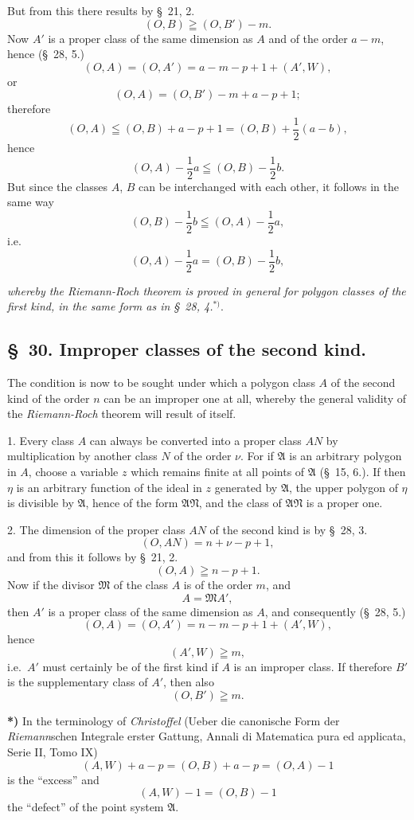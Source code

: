 \documentclass{article}
\begin{document}
But from this there results by §~21, 2.
\[ (O, B) \geqq (O, B')-m. \]
Now $A'$ is a proper class of the same dimension as $A$ and of the order $a-m$, hence (§~28, 5.)
\[ (O, A) = (O, A') = a-m-p+1+(A', W), \]
or
\[ (O, A) = (O, B')-m+a-p+1; \]
therefore
\[ (O, A) \leqq (O, B)+a-p+1 = (O, B)+\frac{1}{2}(a-b), \]
hence
\[ (O, A)-\frac{1}{2}a \leqq (O, B)-\frac{1}{2}b. \]
But since the classes $A$, $B$ can be interchanged with each other, it follows in the same way
\[ (O, B)-\frac{1}{2}b \leqq (O, A)-\frac{1}{2}a, \]
i.e.
\[ (O, A)-\frac{1}{2}a = (O, B)-\frac{1}{2}b, \]

\emph{whereby the Riemann-Roch theorem is proved in general for polygon classes of the first kind, in the same form as in §~28, 4.}${}^{*)}$.

\subsection*{§~30. Improper classes of the second kind.}

The condition is now to be sought under which a polygon class $A$ of the second kind of the order $n$ can be an improper one at all, whereby the general validity of the \emph{Riemann-Roch} theorem will result of itself.

1. Every class $A$ can always be converted into a proper class $AN$ by multiplication by another class $N$ of the order $\nu$. For if $\mathfrak{A}$ is an arbitrary polygon in $A$, choose a variable $z$ which remains finite at all points of $\mathfrak{A}$ (§~15, 6.). If then $\eta$ is an arbitrary function of the ideal in $z$ generated by $\mathfrak{A}$, the upper polygon of $\eta$ is divisible by $\mathfrak{A}$, hence of the form $\mathfrak{A}\mathfrak{N}$, and the class of $\mathfrak{A}\mathfrak{N}$ is a proper one.

2. The dimension of the proper class $AN$ of the second kind is by §~28, 3.
\[ (O, AN) = n+\nu-p+1, \]
and from this it follows by §~21, 2.
\[ (O, A) \geqq n-p+1. \]
Now if the divisor $\mathfrak{M}$ of the class $A$ is of the order $m$, and
\[ A = \mathfrak{M}A', \]
then $A'$ is a proper class of the same dimension as $A$, and consequently (§~28, 5.)
\[ (O, A) = (O, A') = n-m-p+1+(A', W), \]
hence
\[ (A', W) \geqq m, \]
i.e.\ $A'$ must certainly be of the first kind if $A$ is an improper class. If therefore $B'$ is the supplementary class of $A'$, then also
\[ (O, B') \geqq m. \]

\textbf{*)} In the terminology of \emph{Christoffel} (Ueber die canonische Form der \emph{Riemann}schen Integrale erster Gattung, Annali di Matematica pura ed applicata, Serie II, Tomo IX)
\[ (A, W)+a-p = (O, B)+a-p = (O, A)-1 \]
is the ``excess'' and
\[ (A, W)-1 = (O, B)-1 \]
the ``defect'' of the point system $\mathfrak{A}$.
\end{document}
